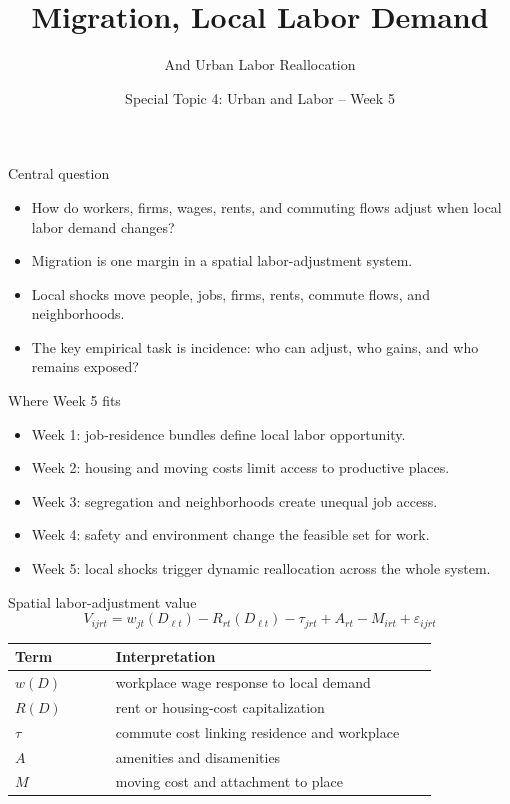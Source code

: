\documentclass[aspectratio=169,11pt]{beamer}
\title{Migration, Local Labor Demand}
\subtitle{And Urban Labor Reallocation}
\author{Special Topic 4: Urban and Labor -- Week 5}
\date{}
\begin{document}
\begin{frame}
  \titlepage
\end{frame}

\begin{frame}{Central question}
\begin{itemize}
    \item How do workers, firms, wages, rents, and commuting flows adjust when local labor demand changes?
    \item Migration is one margin in a spatial labor-adjustment system.
    \item Local shocks move people, jobs, firms, rents, commute flows, and neighborhoods.
    \item The key empirical task is incidence: who can adjust, who gains, and who remains exposed?
\end{itemize}
\end{frame}

\begin{frame}{Where Week 5 fits}
\begin{itemize}
    \item Week 1: job-residence bundles define local labor opportunity.
    \item Week 2: housing and moving costs limit access to productive places.
    \item Week 3: segregation and neighborhoods create unequal job access.
    \item Week 4: safety and environment change the feasible set for work.
    \item Week 5: local shocks trigger dynamic reallocation across the whole system.
\end{itemize}
\end{frame}

\begin{frame}{Spatial labor-adjustment value}
\[
V_{ijrt}
=
w_{jt}(D_{\ell t})
- R_{rt}(D_{\ell t})
- \tau_{jrt}
+ A_{rt}
- M_{irt}
+ \varepsilon_{ijrt}
\]
\small
\begin{tabular}{p{0.20\linewidth} p{0.64\linewidth}}
\toprule
Term & Interpretation \\
\midrule
$w(D)$ & workplace wage response to local demand \\
$R(D)$ & rent or housing-cost capitalization \\
$\tau$ & commute cost linking residence and workplace \\
$A$ & amenities and disamenities \\
$M$ & moving cost and attachment to place \\
\bottomrule
\end{tabular}
\end{frame}
\end{document}
